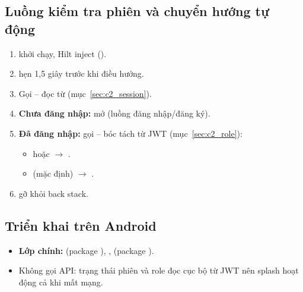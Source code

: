 
\subsection{Luồng kiểm tra phiên và chuyển hướng tự động}
\begin{enumerate}
    \item {} khởi chạy, Hilt inject 
    ().
    \item {} hẹn 1,5 giây trước khi điều hướng.
    \item Gọi  -- đọc từ
     (mục~\ref{sec:c2_session}).
    \item \textbf{Chưa đăng nhập:} mở  (luồng đăng
    nhập/đăng ký).
    \item \textbf{Đã đăng nhập:} gọi  --
    bóc tách  từ JWT (mục~\ref{sec:c2_role}):
    \begin{itemize}
        \item {} hoặc  $\rightarrow$
        .
        \item {} (mặc định) $\rightarrow$ .
    \end{itemize}
    \item {} gỡ khỏi back stack.
\end{enumerate}

\subsection{Triển khai trên Android}
\begin{itemize}
    \item \textbf{Lớp chính:}  (package
    ), ,  (package
    ).
    \item Không gọi API: trạng thái phiên và role đọc cục bộ từ JWT nên
    splash hoạt động cả khi mất mạng.
\end{itemize}

